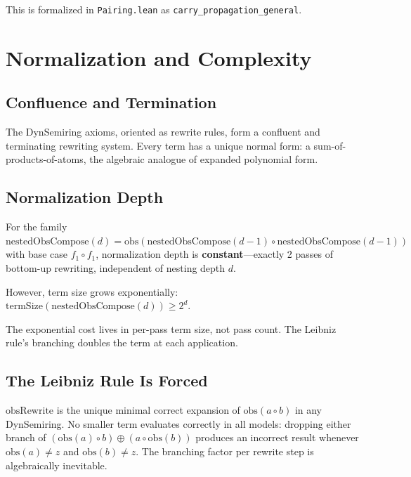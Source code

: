 \documentclass[11pt,a4paper]{article}
\theoremstyle{definition}
\theoremstyle{remark}
\newcommand{\compose}{\mathbin{\circ}}
\newcommand{\opl}{\oplus}
\newcommand{\obs}{\mathrm{obs}}
\newcommand{\fone}{f_1}
\newcommand{\obsRewrite}{\mathrm{obsRewrite}}
\newcommand{\termSize}{\mathrm{termSize}}
\begin{document}
This is formalized in \texttt{Pairing.lean} as
\texttt{carry\_propagation\_general}.

\section{Normalization and Complexity}
\label{sec:normalization}

\subsection{Confluence and Termination}

The DynSemiring axioms, oriented as rewrite rules, form a confluent and
terminating rewriting system. Every term has a unique normal form: a
sum-of-products-of-atoms, the algebraic analogue of expanded polynomial form.

\subsection{Normalization Depth}

For the family
$\mathrm{nestedObsCompose}(d) =
\obs(\mathrm{nestedObsCompose}(d{-}1) \compose \mathrm{nestedObsCompose}(d{-}1))$
with base case $\fone \compose \fone$, normalization depth is
\textbf{constant}---exactly 2 passes of bottom-up rewriting, independent of
nesting depth $d$.

However, term size grows exponentially:
$\termSize(\mathrm{nestedObsCompose}(d)) \geq 2^d$.

The exponential cost lives in per-pass term size, not pass count. The
Leibniz rule's branching doubles the term at each application.

\subsection{The Leibniz Rule Is Forced}

$\obsRewrite$ is the unique minimal correct expansion of
$\obs(a \compose b)$ in any DynSemiring. No smaller term evaluates
correctly in all models: dropping either branch of
$(\obs(a) \compose b) \opl (a \compose \obs(b))$ produces an incorrect
result whenever $\obs(a) \neq z$ and $\obs(b) \neq z$. The branching
factor per rewrite step is algebraically inevitable.

\end{document}
